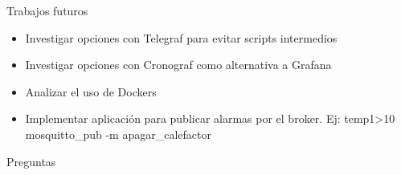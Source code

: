 \documentclass[aspectratio= 43]{beamer}
\begin{document}
\begin{frame}{Trabajos futuros}
      \begin{itemize}
	    \item Investigar opciones con Telegraf para evitar scripts intermedios
	    \item Investigar opciones con Cronograf como alternativa a Grafana
	    \item Analizar el uso de Dockers
	    \item Implementar aplicación para publicar alarmas por el broker. Ej: temp1>10 mosquitto\_pub -m apagar\_calefactor 
	\end{itemize}
\end{frame}


  \begin{frame}{Preguntas}
  \end{frame}
\end{document}
